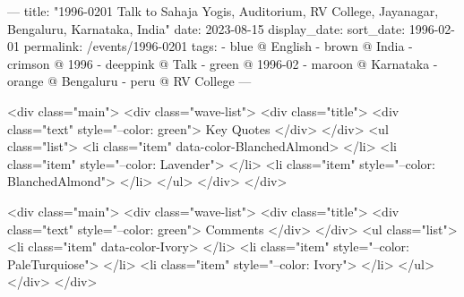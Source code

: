 ---
title: "1996-0201 Talk to Sahaja Yogis, Auditorium, RV College, Jayanagar, Bengaluru, Karnataka, India"
date: 2023-08-15
display_date: 
sort_date: 1996-02-01
permalink: /events/1996-0201
tags:
  - blue @ English
  - brown @ India
  - crimson @ 1996
  - deeppink @ Talk
  - green @ 1996-02
  - maroon @ Karnataka
  - orange @ Bengaluru
  - peru @ RV College
---

<div class="main">
  <div class="wave-list">
    <div class="title">
      <div class="text" style="--color: green">
        Key Quotes
      </div>
    </div>
    <ul class="list">
        <li class="item" data-color-BlanchedAlmond>
        </li>
        <li class="item" style="--color: Lavender">
        </li>
        <li class="item" style="--color: BlanchedAlmond">
        </li>
      </ul>
  </div>
</div>

<div class="main">
  <div class="wave-list">
    <div class="title">
      <div class="text" style="--color: green">
        Comments
      </div>
    </div>
    <ul class="list">
        <li class="item" data-color-Ivory>
        </li>
        <li class="item" style="--color: PaleTurquiose">
        </li>
        <li class="item" style="--color: Ivory">
        </li>
      </ul>
  </div>
</div>